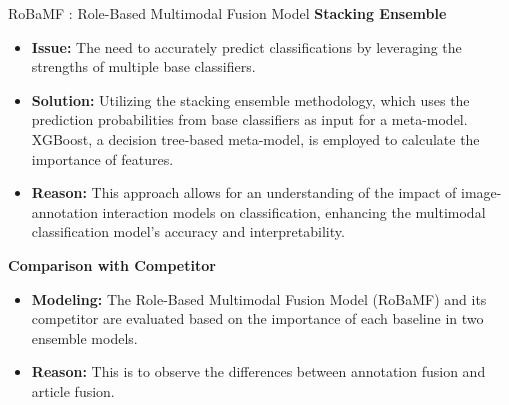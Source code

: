 \documentclass[final]{beamer}
\newlength{\colwidth}
\begin{document}
\begin{frame}[t]
\begin{columns}[t]
\begin{column}{\colwidth}
\begin{alertblock}{RoBaMF : Role-Based Multimodal Fusion Model}
    \textbf{\large Stacking Ensemble}
    \begin{itemize}
        \item \textbf{Issue:} The need to accurately predict classifications by leveraging the strengths of multiple base classifiers.
        \item \textbf{Solution:} Utilizing the stacking ensemble methodology, which uses the prediction probabilities from base classifiers as input for a meta-model. XGBoost, a decision tree-based meta-model, is employed to calculate the importance of features.
        \item \textbf{Reason:} This approach allows for an understanding of the impact of image-annotation interaction models on classification, enhancing the multimodal classification model's accuracy and interpretability.
    \end{itemize}
    
    \vspace{5mm} %
    
    \textbf{\large Comparison with Competitor}
    \begin{itemize}
        \item \textbf{Modeling:} The Role-Based Multimodal Fusion Model (RoBaMF) and its competitor are evaluated based on the importance of each baseline in two ensemble models.
        \item \textbf{Reason:} This is to observe the differences between annotation fusion and article fusion.
    \end{itemize}

    \vspace{3em}


\end{alertblock}
\end{column}
\end{columns}
\end{frame}
\end{document}
